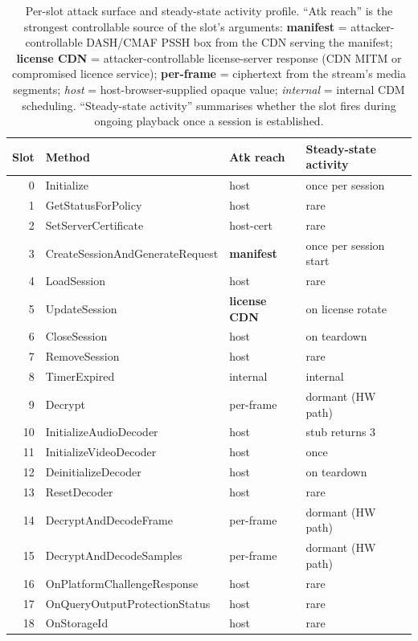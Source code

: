 \documentclass[11pt,letterpaper]{article}
\begin{document}
\begin{table}[h]
\centering\small
\begin{tabular}{rlll}
\toprule
\textbf{Slot} & \textbf{Method} & \textbf{Atk reach} & \textbf{Steady-state activity} \\
\midrule
0  & Initialize                       & host & once per session \\
1  & GetStatusForPolicy               & host & rare \\
2  & SetServerCertificate             & host-cert & rare \\
3  & CreateSessionAndGenerateRequest  & \textbf{manifest} & once per session start \\
4  & LoadSession                      & host & rare \\
5  & UpdateSession                    & \textbf{license CDN} & on license rotate \\
6  & CloseSession                     & host & on teardown \\
7  & RemoveSession                    & host & rare \\
8  & TimerExpired                     & internal & internal \\
9  & Decrypt                          & per-frame  & dormant (HW path) \\
10 & InitializeAudioDecoder           & host & stub returns 3 \\
11 & InitializeVideoDecoder           & host & once \\
12 & DeinitializeDecoder              & host & on teardown \\
13 & ResetDecoder                     & host & rare \\
14 & DecryptAndDecodeFrame            & per-frame  & dormant (HW path) \\
15 & DecryptAndDecodeSamples          & per-frame  & dormant (HW path) \\
16 & OnPlatformChallengeResponse      & host & rare \\
17 & OnQueryOutputProtectionStatus    & host & rare \\
18 & OnStorageId                      & host & rare \\
\bottomrule
\end{tabular}
\caption{Per-slot attack surface and steady-state activity profile.
``Atk reach'' is the strongest controllable source of the slot's
arguments: \textbf{manifest} = attacker-controllable DASH/CMAF PSSH
box from the CDN serving the manifest; \textbf{license CDN} =
attacker-controllable license-server response (CDN MITM or
compromised licence service); \textbf{per-frame} = ciphertext from
the stream's media segments; \emph{host} = host-browser-supplied
opaque value; \emph{internal} = internal CDM scheduling.
``Steady-state activity'' summarises whether the slot fires during
ongoing playback once a session is established.}
\label{tab:attack-surface}
\end{table}
\end{document}
